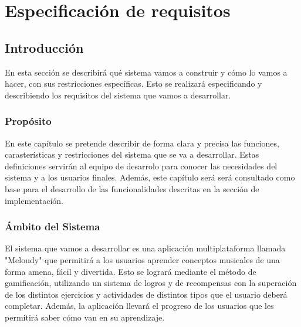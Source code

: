 \chapter{Especificación de requisitos}
\label{cap:especificacion-requisitos}

\section{Introducción}
En esta sección se describirá qué sistema vamos a construir y cómo lo vamos a hacer, 
con sus restricciones específicas. Esto se realizará especificando y describiendo
 los requisitos del sistema que vamos a desarrollar. 

\subsection{Propósito}
En este capítulo se pretende describir de forma clara y precisa las funciones, carasterísticas y restricciones
del sistema que se va a desarrollar. Estas definiciones servirán al equipo de desarrolo para
conocer las necesidades del sistema y a los usuarios finales. Además, este capítulo será será consultado como
base para el desarrollo de las funcionalidades descritas en la sección de implementación.

\subsection{Ámbito del Sistema}
El sistema que vamos a desarrollar es una aplicación multiplataforma llamada "Meloudy" que permitirá a los usuarios
aprender conceptos musicales de una forma amena, fácil y divertida. Esto se logrará mediante el método de gamificación,
utilizando un sistema de logros y de recompensas con la superación de los distintos ejercicios y actividades de distintos tipos que el usuario deberá completar.
Además, la aplicación llevará el progreso de los usuarios que les permitirá saber cómo van en su aprendizaje.

